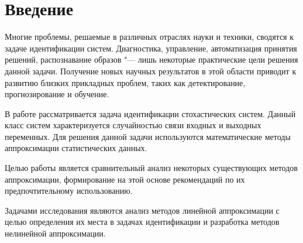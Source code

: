 \chapter*{Введение}

Многие проблемы, решаемые в различных отраслях науки и техники, сводятся к задаче идентификации систем.
Диагностика, управление, автоматизация принятия решений, распознавание образов "---
лишь некоторые практические цели решения данной задачи.
Получение новых научных результатов в этой области приводит к развитию близких прикладных проблем,
таких как детектирование, прогнозирование и обучение.

В работе рассматривается задача идентификации стохастических систем.
Данный класс систем характеризуется случайностью связи входных и выходных переменных.
Для решения данной задачи используются математические методы аппроксимации статистических данных.

Целью работы является сравнительный анализ некоторых существующих методов аппроксимации,
формирование на этой основе рекомендаций по их предпочтительному использованию.

Задачами исследования являются анализ методов линейной аппроксимации с целью определения их
места в задачах идентификации {\color{red} и разработка методов нелинейной аппроксимации}.

